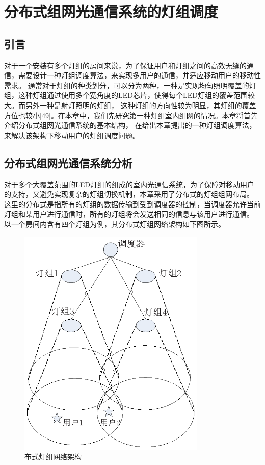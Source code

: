 
\chapter{分布式组网光通信系统的灯组调度}\label{chap:baseband-technology}
\section{引言}
对于一个安装有多个灯组的房间来说，为了保证用户和灯组之间的高效无缝的通信，需要设计一种灯组调度算法，来实现多用户的通信，并适应移动用户的移动性需求。
通常对于灯组的种类划分，可以分为两种，一种是实现均匀照明覆盖的灯组，这种灯组通过使用多个宽角度的LED芯片，使得每个LED灯组的覆盖范围较大。而另外一种是射灯照明的灯组，
这种灯组的方向性较为明显，其灯组的覆盖方位也较小[49]。在本章中，我们先研究第一种灯组室内组网的情况。本章将首先介绍分布式组网光通信系统的基本结构，
在给出本章提出的一种灯组调度算法，来解决该架构下移动用户的灯组调度问题。

\section{分布式组网光通信系统分析}
对于多个大覆盖范围的LED灯组的组成的室内光通信系统，为了保障对移动用户的支持，又避免实现复杂的灯组切换机制，本章采用了分布式的灯组组网布局。
这里的分布式是指所有的灯组的数据传输到受到调度器的控制，当调度器允许当前灯组和某用户进行通信时，所有的灯组将会发送相同的信息与该用户进行通信。
以一个房间内含有四个灯组为例，其分布式灯组网络架构如下图所示。

\begin{figure}[htbp]
    \centering
	\includegraphics[width=0.8\textwidth]{figures/chapter-4/DistributionOverView.eps}
	\caption{布式灯组网络架构}
	\label{fig:distribution-overview}
\end{figure}

